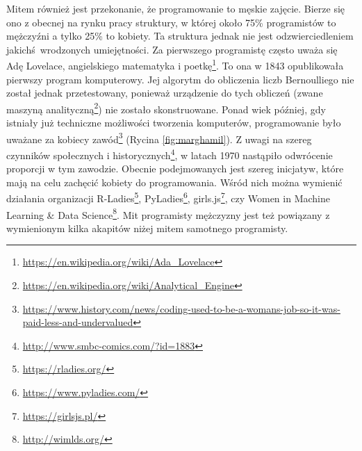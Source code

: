 \documentclass[paper=6in:9in,pagesize=pdftex,headinclude=on,footinclude=on,10pt]{scrbook}
\DeclareRobustCommand{\href}[2]{#2\footnote{\url{#1}}}
\begin{document}
Mitem również jest przekonanie, że programowanie to męskie zajęcie.
Bierze się ono z obecnej na rynku pracy struktury, w której około 75\% programistów to mężczyźni a tylko 25\% to kobiety.
Ta struktura jednak nie jest odzwierciedleniem jakichś~wrodzonych umiejętności.
Za pierwszego programistę często uważa się Adę Lovelace, angielskiego matematyka i poetkę\footnote{\url{https://en.wikipedia.org/wiki/Ada_Lovelace}}.
To ona w 1843 opublikowała pierwszy program komputerowy.
Jej algorytm do obliczenia liczb Bernoulliego nie został jednak przetestowany, ponieważ urządzenie do tych obliczeń (zwane maszyną analityczną\footnote{\url{https://en.wikipedia.org/wiki/Analytical_Engine}}) nie zostało skonstruowane.
Ponad wiek później, gdy istniały już techniczne możliwości tworzenia komputerów, programowanie było uważane za kobiecy zawód\footnote{\url{https://www.history.com/news/coding-used-to-be-a-womans-job-so-it-was-paid-less-and-undervalued}} (Rycina \ref{fig:marghamil}).
Z uwagi na szereg czynników społecznych i historycznych\footnote{\url{http://www.smbc-comics.com/?id=1883}}, w latach 1970 nastąpiło odwrócenie proporcji w tym zawodzie.
Obecnie podejmowanych jest szereg inicjatyw, które mają na celu zachęcić kobiety do programowania.
Wśród nich można wymienić działania organizacji \href{https://rladies.org/}{R-Ladies}, \href{https://www.pyladies.com/}{PyLadies}, \href{https://girlsjs.pl/}{girls.js}, czy \href{http://wimlds.org/}{Women in Machine Learning \& Data Science}.
Mit programisty mężczyzny jest też powiązany z wymienionym kilka akapitów niżej mitem samotnego programisty.
\end{document}
